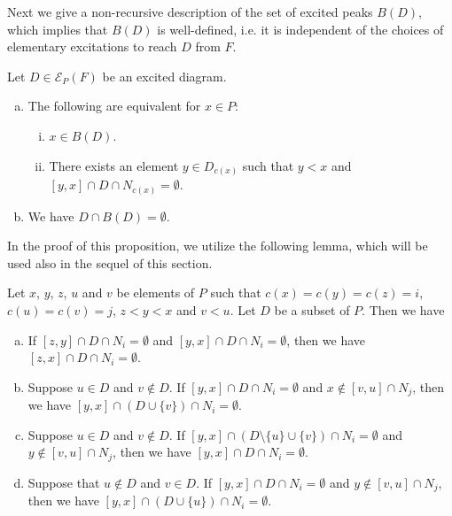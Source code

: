 \documentclass[ALCO,ThmDefs,Unicode,epreuves]{cedram}
\newcommand\EE{\mathcal{E}}
\begin{document}
Next we give a non-recursive description of the set of excited peaks $B(D)$, 
which implies that $B(D)$ is well-defined, i.e. 
it is independent of the choices of elementary excitations to reach $D$ from $F$.

\begin{prop}
\label{prop:BD}
Let $D \in \EE_P(F)$ be an excited diagram.
\begin{enumerate}[(a)]
\item\label{prop3.7_a} %
The following are equivalent for $x \in P$:
\begin{enumerate}[(i)]
\item\label{prop3.7_a_i} %
$x \in B(D)$.
\item\label{prop3.7_a_ii} %
There exists an element $y \in D_{c(x)}$ such that $y<x$ and $[y,x] \cap D \cap N_{c(x)} = \emptyset$.
\end{enumerate}
\item\label{prop3.7_b} %
We have $D \cap B(D) = \emptyset$.
\end{enumerate}
\end{prop}

In the proof of this proposition, we utilize the following lemma, 
which will be used also in the sequel of this section.

\begin{lemm}
\label{lem:interval}
Let $x$, $y$, $z$, $u$ and $v$ be elements of $P$ such that $c(x) = c(y) = c(z) = i$, 
$c(u) = c(v) = j$,
$z<y<x$ and $v<u$.
Let $D$ be a subset of $P$.
Then we have
\begin{enumerate}[(a)]
\item\label{lemma3.8_a} %
If $[z,y] \cap D \cap N_i = \emptyset$ and $[y,x] \cap D \cap N_i = \emptyset$, 
then we have $[z,x] \cap D \cap N_i = \emptyset$.
\item\label{lemma3.8_b} %
Suppose $u \in D$ and $v \not\in D$.
If $[y,x] \cap D \cap N_i = \emptyset$ and $x \not\in [v,u] \cap N_j$, 
then we have $[y,x] \cap (D \cup \{ v \}) \cap N_i = \emptyset$.
\item\label{lemma3.8_c} %
Suppose $u \in D$ and $v \not\in D$.
If $[y,x] \cap (D \setminus \{ u \} \cup \{ v \}) \cap N_i = \emptyset$ 
and $y \not\in [v,u] \cap N_j$, 
then we have $[y,x] \cap D \cap N_i = \emptyset$.
\item\label{lemma3.8_d} %
Suppose that $u \not\in D$ and $v \in D$.
If $[y,x] \cap D \cap N_i = \emptyset$ and $y \not\in [v,u] \cap N_j$, 
then we have $[y,x] \cap (D \cup \{ u \}) \cap N_i = \emptyset$.
\end{enumerate}
\end{lemm}
\end{document}
